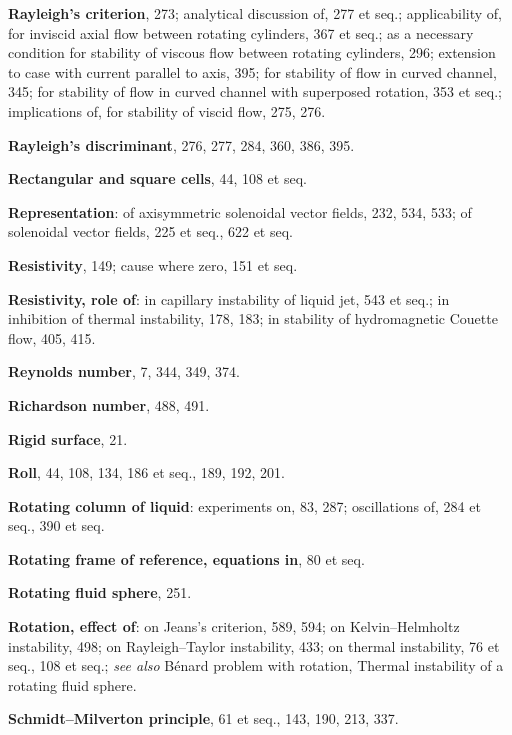 \begin{small}
\medskip\noindent
\textbf{Rayleigh's criterion}, 273;
  analytical discussion of, 277 et seq.;
  applicability of, for inviscid axial flow
    between rotating cylinders, 367 et
    seq.;
  as a necessary condition for stability of
    viscous flow between rotating cylinders, 296;
  extension to case with current parallel
    to axis, 395;
  for stability of flow in curved channel,
    345;
  for stability of flow in curved channel
    with superposed rotation, 353 et seq.;
  implications of, for stability of viscid
    flow, 275, 276.

\medskip\noindent
\textbf{Rayleigh's discriminant}, 276, 277, 284,
  360, 386, 395.

\medskip\noindent
\textbf{Rectangular and square cells}, 44, 108 et seq.

\medskip\noindent
\textbf{Representation}:
  of axisymmetric solenoidal vector fields,
    232, 534, 533;
  of solenoidal vector fields, 225 et seq.,
    622 et seq.

\medskip\noindent
\textbf{Resistivity}, 149;
  cause where zero, 151 et seq.

\medskip\noindent
\textbf{Resistivity, role of}:
  in capillary instability of liquid jet, 543
    et seq.;
  in inhibition of thermal instability, 178,
    183;
  in stability of hydromagnetic Couette
    flow, 405, 415.

\medskip\noindent
\textbf{Reynolds number}, 7, 344, 349, 374.

\medskip\noindent
\textbf{Richardson number}, 488, 491.

\medskip\noindent
\textbf{Rigid surface}, 21.

\medskip\noindent
\textbf{Roll}, 44, 108, 134, 186 et seq., 189, 192, 201.

\medskip\noindent
\textbf{Rotating column of liquid}:
  experiments on, 83, 287;
  oscillations of, 284 et seq., 390 et seq.

\medskip\noindent
\textbf{Rotating frame of reference, equations in},
  80 et seq.

\medskip\noindent
\textbf{Rotating fluid sphere}, 251.

\medskip\noindent
\textbf{Rotation, effect of}:
  on Jeans's criterion, 589, 594;
  on Kelvin--Helmholtz instability, 498;
  on Rayleigh--Taylor instability, 433;
  on thermal instability, 76 et seq., 108
    et seq.;
  \textit{see also} B\'enard problem with rotation,
    Thermal instability of a rotating fluid
    sphere.

\bigskip\noindent
\textbf{Schmidt--Milverton principle}, 61 et seq.,
  143, 190, 213, 337.


\end{small}
